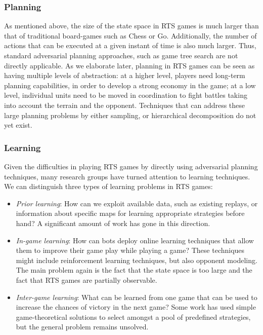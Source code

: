 \documentclass[journal]{IEEEtran}
\begin{document}
\subsubsection{Planning}
As mentioned above, the size of the state space in RTS games is much larger than that of traditional board-games such as Chess or Go. Additionally, the number of actions that can be executed at a given instant of time is also much larger. Thus, standard adversarial planning approaches, such as game tree search are not directly applicable. As we elaborate later, planning in RTS games can be seen as having multiple levels of abstraction: at a higher level, players need long-term planning capabilities, in order to develop a strong economy in the game; at a low level, individual units need to be moved in coordination to fight battles taking into account the terrain and the opponent. Techniques that can address these large planning problems by either sampling, or hierarchical decomposition do not yet exist.

\subsubsection{Learning}
Given the difficulties in playing RTS games by directly using adversarial planning techniques, many research groups have turned attention to learning techniques. We can distinguish three types of learning problems in RTS games:
\begin{itemize}
\item {\em Prior learning}: How can we exploit available data, such as existing replays, or information about specific maps for learning appropriate strategies before hand? A significant amount of work has gone in this direction.%
\item {\em In-game learning}: How can bots deploy online learning techniques that allow them to improve their game play while playing a game? These techniques might include reinforcement learning techniques, but also opponent modeling. The main problem again is the fact that the state space is too large and the fact that RTS games are partially observable.
\item {\em Inter-game learning}: What can be learned from one game that can be used to increase the chances of victory in the next game? Some work has used simple game-theoretical solutions to select amongst a pool of predefined strategies, but the general problem remains unsolved.
\end{itemize}
\end{document}
